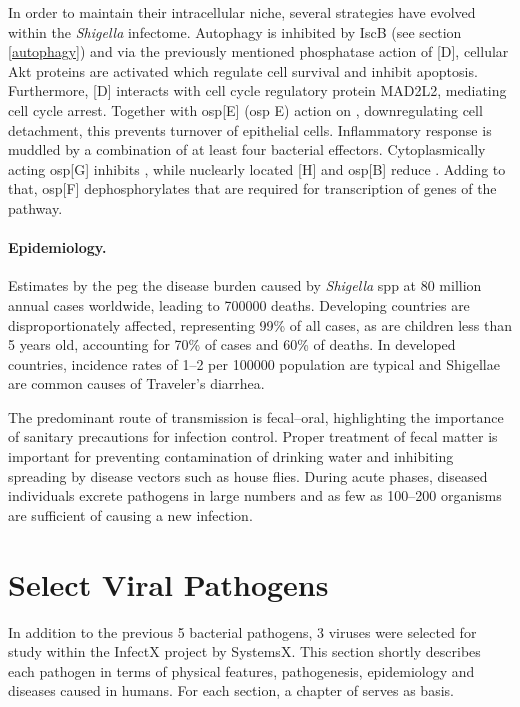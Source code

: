 In order to maintain their intracellular niche, several strategies have evolved within the \textit{Shigella} infectome. Autophagy is inhibited by IscB (see section \ref{autophagy}) and via the previously mentioned phosphatase action of [D], cellular Akt proteins are activated which regulate cell survival and inhibit apoptosis. Furthermore, [D] interacts with cell cycle regulatory protein MAD2L2, mediating cell cycle arrest. Together with \acrshort{osp}[E] (\acrlong{osp} E) action on , downregulating cell detachment, this prevents turnover of epithelial cells. Inflammatory response is muddled by a combination of at least four bacterial effectors. Cytoplasmically acting \acrshort{osp}[G] inhibits , while nuclearly located [H] and \acrshort{osp}[B] reduce . Adding to that, \acrshort{osp}[F] dephosphorylates  that are required for transcription of genes of the  pathway.

\paragraph{Epidemiology.}
Estimates by the  peg the disease burden caused by \textit{Shigella} \acrshort{spp} at 80 million annual cases worldwide, leading to 700000 deaths. Developing countries are disproportionately affected, representing 99\% of all cases, as are children less than 5 years old, accounting for 70\% of cases and 60\% of deaths. In developed countries, incidence rates of 1--2 per 100000 population are typical and Shigellae are common causes of Traveler's diarrhea.

The predominant route of transmission is fecal--oral, highlighting the importance of sanitary precautions for infection control. Proper treatment of fecal matter is important for preventing contamination of drinking water and inhibiting spreading by disease vectors such as house flies. During acute phases, diseased individuals excrete pathogens in large numbers and as few as 100--200 organisms are sufficient of causing a new infection.

\section{Select Viral Pathogens}

In addition to the previous 5 bacterial pathogens, 3 viruses were selected for study within the InfectX  project by SystemsX. This section shortly describes each pathogen in terms of physical features, pathogenesis, epidemiology and diseases caused in humans. For each section, a chapter of \citet{Craighead2000} serves as basis.

